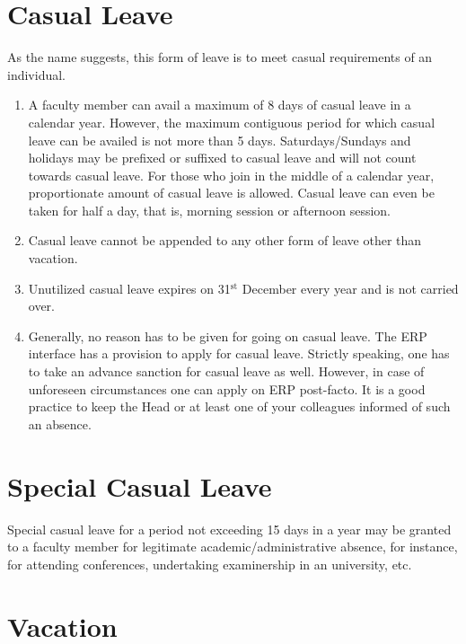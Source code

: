 \documentclass[
  10pt,
  a5paper,
  10pt,
  openany]{amsbook}
\providecommand{\tightlist}{%
  \setlength{\itemsep}{0pt}\setlength{\parskip}{0pt}}
\begin{document}
\section{Casual Leave}\label{casual-leave}

As the name suggests, this form of leave is to meet casual requirements
of an individual.

\begin{enumerate}
\def\labelenumi{\arabic{enumi}.}
\tightlist
\item
  A faculty member can avail a maximum of 8 days of casual leave in a
  calendar year. However, the maximum contiguous period for which casual
  leave can be availed is not more than 5 days. Saturdays/Sundays and
  holidays may be prefixed or suffixed to casual leave and will not
  count towards casual leave. For those who join in the middle of a
  calendar year, proportionate amount of casual leave is allowed. Casual
  leave can even be taken for half a day, that is, morning session or
  afternoon session.
\item
  Casual leave cannot be appended to any other form of leave other than
  vacation.
\item
  Unutilized casual leave expires on 31\(^{\text{st}}\) December every
  year and is not carried over.
\item
  Generally, no reason has to be given for going on casual leave. The
  ERP interface has a provision to apply for casual leave. Strictly
  speaking, one has to take an advance sanction for casual leave as
  well. However, in case of unforeseen circumstances one can apply on
  ERP post-facto. It is a good practice to keep the Head or at least one
  of your colleagues informed of such an absence.
\end{enumerate}

\section{Special Casual Leave}\label{special-casual-leave}

Special casual leave for a period not exceeding 15 days in a year may be
granted to a faculty member for legitimate academic/administrative
absence, for instance, for attending conferences, undertaking
examinership in an university, etc.

\section{Vacation}\label{vacation}
\end{document}
